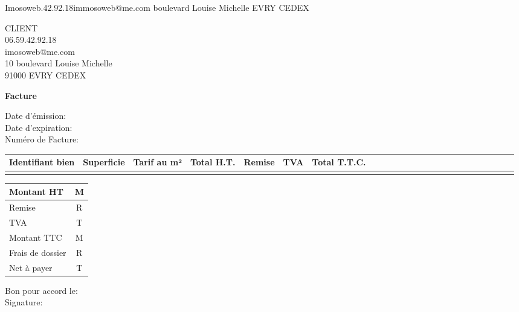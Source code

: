 \documentclass{article}
\begin{document}
\begin{raggedleft}
\newline Imosoweb.42.92.18\newline immosoweb@me.com boulevard Louise Michelle EVRY CEDEX
\end{raggedleft}

\begin{flushright}
CLIENT
\\06.59.42.92.18
\\imosoweb@me.com
\\10 boulevard Louise Michelle
\\91000 EVRY CEDEX
\end{flushright}

\begin{center}
\president
\textbf{ \huge{Facture}}
\end{center}
\vspace{0.5cm}
\begin{flushleft}
Date d'émission:
\\Date d'expiration:
\\Numéro de Facture:
\end{flushleft}

\vspace { 1cm } 
\begin{center}
\begin{tabular}{|p{3cm}|p{2cm}|p{2cm}|p{2cm}|p{2cm}|p{2cm}|p{2cm}|}
\hline
Identifiant bien & Superficie & Tarif au m² & Total H.T. &Remise &TVA & Total T.T.C.  \\
\hline
& & & & 
& & & &
& & & &
& & & & 
& & & & 
& & & & \\
\hline
\end{tabular}
\end{center}

\begin{flushright}
\begin{tabular}{|p{4cm} c|}
\hline
Montant HT & M \\
\hline
Remise & R \\
\hline
TVA & T \\
\hline
Montant TTC & M \\
\hline
Frais de dossier & R \\
\hline
Net à payer & T \\
\hline
\end{tabular}
\end{flushright}

\vspace{1cm}
\begin{flushleft}
Bon pour accord le:
\\Signature:
\end{flushleft}
\end{document}
